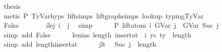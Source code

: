 \begin{isabellebody}
\ {\isacharquery}{\kern0pt}thesis\isanewline
\ \ \ \ \ \ \isamarkupfalse%
\ {\isacharparenleft}{\kern0pt}metis\ P{}\ TyVar{\isachardot}{\kern0pt}hyps{\isacharparenleft}{\kern0pt}{}{\isacharcomma}{\kern0pt}{}{\isacharcomma}{\kern0pt}{}{\isacharcomma}{\kern0pt}{}{\isacharparenright}{\kern0pt}\ lift{\isachardot}{\kern0pt}simps{\isacharparenleft}{\kern0pt}{}{\isacharparenright}{\kern0pt}\ lift{\isacharunderscore}{\kern0pt}graph{\isachardot}{\kern0pt}simps{\isacharparenleft}{\kern0pt}{}{\isacharparenright}{\kern0pt}\ lookup\ typing{\isachardot}{\kern0pt}TyVar{\isacharparenright}{\kern0pt}\isanewline
\ \ \isamarkupfalse%
\isanewline
\ \ \ \ \isamarkupfalse%
\ False\isanewline
\ \ \ \ \isamarkupfalse%
\ \isamarkupfalse%
\ i{\isacharunderscore}{\kern0pt}le{\isacharunderscore}{\kern0pt}j{\isacharcolon}{\kern0pt}\ {\isachardoublequoteopen}i\ {\isasymle}\ j{\isachardoublequoteclose}\ \isamarkupfalse%
\ simp\isanewline
\isanewline
\ \ \ \ \isamarkupfalse%
\ P{}{\isacharcolon}{\kern0pt}\ {\isachardoublequoteopen}lift{\isacharunderscore}{\kern0pt}atom\ i\ {\isacharparenleft}{\kern0pt}GVar\ j{\isacharparenright}{\kern0pt}\ {\isacharequal}{\kern0pt}\ GVar\ {\isacharparenleft}{\kern0pt}Suc\ j{\isacharparenright}{\kern0pt}{\isachardoublequoteclose}\isanewline
\ \ \ \ \ \ \isamarkupfalse%
\ {\isacharparenleft}{\kern0pt}simp\ add{\isacharcolon}{\kern0pt}\ False{\isacharparenright}{\kern0pt}\isanewline
\isanewline
\ \ \ \ \isamarkupfalse%
\ len{\isacharunderscore}{\kern0pt}ins{\isacharcolon}{\kern0pt}\ {\isachardoublequoteopen}length\ {\isacharparenleft}{\kern0pt}insert{\isacharunderscore}{\kern0pt}at\ {\isasymGamma}\ i\ {\isacharparenleft}{\kern0pt}ys{\isacharcomma}{\kern0pt}\ ty{}{\isacharparenright}{\kern0pt}{\isacharparenright}{\kern0pt}\ {\isacharequal}{\kern0pt}\ length\ {\isasymGamma}\ {\isacharplus}{\kern0pt}\ {}{\isachardoublequoteclose}\isanewline
\ \ \ \ \ \ \isamarkupfalse%
\ {\isacharparenleft}{\kern0pt}simp\ add{\isacharcolon}{\kern0pt}\ length{\isacharunderscore}{\kern0pt}insert{\isacharunderscore}{\kern0pt}at{\isacharparenright}{\kern0pt}\isanewline
\isanewline
\ \ \ \ \isamarkupfalse%
\ j{\isacharunderscore}{\kern0pt}lt\ \isamarkupfalse%
\ {\isachardoublequoteopen}Suc\ j\ {\isasymle}\ length\ {\isasymGamma}{\isachardoublequoteclose}\isanewline

\end{isabellebody}
